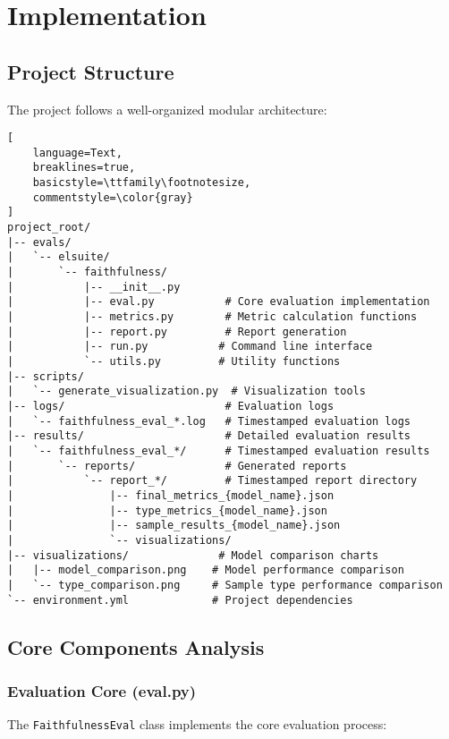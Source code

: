 \section{Implementation}

\subsection{Project Structure}
The project follows a well-organized modular architecture:

\begin{lstlisting}[
    language=Text,
    breaklines=true,
    basicstyle=\ttfamily\footnotesize,
    commentstyle=\color{gray}
]
project_root/
|-- evals/
|   `-- elsuite/
|       `-- faithfulness/
|           |-- __init__.py
|           |-- eval.py           # Core evaluation implementation
|           |-- metrics.py        # Metric calculation functions
|           |-- report.py         # Report generation
|           |-- run.py           # Command line interface
|           `-- utils.py         # Utility functions
|-- scripts/
|   `-- generate_visualization.py  # Visualization tools
|-- logs/                         # Evaluation logs
|   `-- faithfulness_eval_*.log   # Timestamped evaluation logs
|-- results/                      # Detailed evaluation results
|   `-- faithfulness_eval_*/      # Timestamped evaluation results
|       `-- reports/              # Generated reports
|           `-- report_*/         # Timestamped report directory
|               |-- final_metrics_{model_name}.json    
|               |-- type_metrics_{model_name}.json     
|               |-- sample_results_{model_name}.json   
|               `-- visualizations/                    
|-- visualizations/              # Model comparison charts
|   |-- model_comparison.png    # Model performance comparison
|   `-- type_comparison.png     # Sample type performance comparison
`-- environment.yml             # Project dependencies
\end{lstlisting}

\vspace{0.5em}
\subsection{Core Components Analysis}

\subsubsection{Evaluation Core (eval.py)}
The \texttt{FaithfulnessEval} class implements the core evaluation process:

